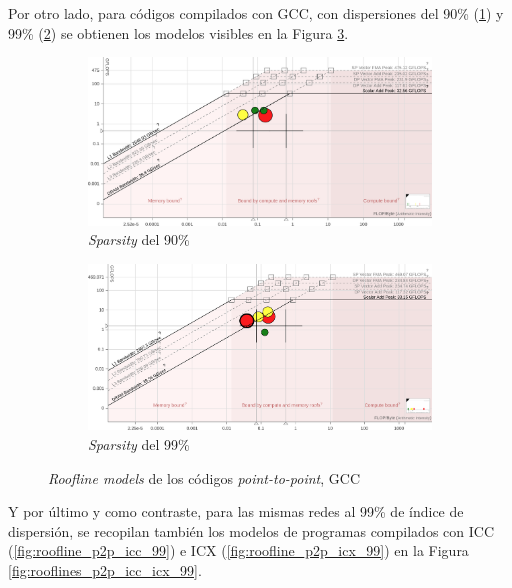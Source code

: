 Por otro lado, para códigos compilados con GCC, con dispersiones del 90\% (\ref{fig:roofline_p2p_gcc_90}) y 99\% (\ref{fig:roofline_p2p_gcc_99}) se obtienen los modelos visibles en la Figura \ref{fig:rooflines_p2p_gcc_90_99}.

\begin{figure}[htpb]
    \centering
    \begin{subfigure}[b]{0.495\textwidth}
        \includegraphics[width=\textwidth]{img/rooflines/roofline_p2p_90.png}
        \caption{\textit{Sparsity} del 90\%}
        \label{fig:roofline_p2p_gcc_90}
    \end{subfigure}
    \begin{subfigure}[b]{0.495\textwidth}
        \includegraphics[width=\textwidth]{img/rooflines/roofline_p2p_99.png}
        \caption{\textit{Sparsity} del 99\%}
        \label{fig:roofline_p2p_gcc_99}
    \end{subfigure}

    \caption{\textit{Roofline models} de los códigos \textit{point-to-point}, GCC}
    \label{fig:rooflines_p2p_gcc_90_99}
\end{figure}

Y por último y como contraste, para las mismas redes al 99\% de índice de dispersión, se recopilan también los modelos de programas compilados con ICC (\ref{fig:roofline_p2p_icc_99}) e ICX (\ref{fig:roofline_p2p_icx_99}) en la Figura \ref{fig:rooflines_p2p_icc_icx_99}.

